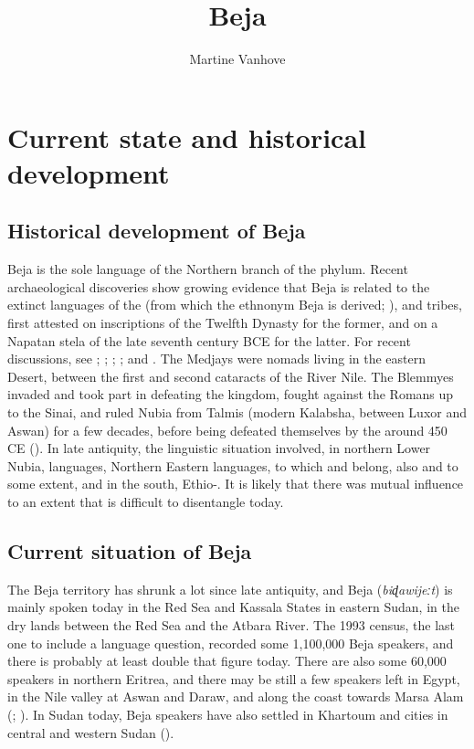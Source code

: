 \documentclass[output=paper]{langsci/langscibook}
\author{Martine Vanhove\affiliation{LLACAN (CNRS, INALCO)}}
\title{Beja}
\begin{document}
\maketitle 
  


 \section{Current state and historical development}


 \subsection{Historical development of Beja}


Beja is the sole language of the {Northern}  branch of the  phylum. Recent archaeological discoveries show growing evidence that Beja is related to the extinct languages of the  (from which the ethnonym Beja is derived; \citealt[1175]{Rilly2014}), and  tribes, first attested on  inscriptions of the Twelfth Dynasty for the former, and on a Napatan stela of the late seventh century BCE for the latter. For recent discussions, see \citet{Browne2003}; \citet{El-Sayed2011}; \citet{Zibelius-Chen2014}; \citet{Rilly2014}; and \citet{Rilly2018}. The Medjays were nomads living in the eastern  Desert, between the first and second cataracts of the River Nile. The Blemmyes invaded and took part in defeating the  kingdom, fought against the Romans up to the Sinai, and ruled Nubia from Talmis (modern Kalabsha, between Luxor and Aswan) for a few decades, before being defeated themselves by the  around 450 CE (\citealt{Rilly2018}). In late antiquity, the linguistic situation involved, in northern Lower Nubia,  languages, {Northern} {Eastern}  languages, to which  and  belong, also  and  to some extent, and in the south, Ethio-. It is likely that there was mutual influence to an extent that is difficult to disentangle today. 


 
 \subsection{Current situation of Beja}


The Beja territory has shrunk a lot since late antiquity, and Beja (\textit{biɖawijeːt}) is mainly spoken today in the Red Sea and Kassala States in eastern Sudan, in the dry lands between the Red Sea and the Atbara River. The 1993 census, the last one to include a language question, recorded some 1,100,000 Beja speakers, and there is probably at least double that figure today. There are also some 60,000 speakers in northern Eritrea, and there may be still a few speakers left in Egypt, in the Nile valley at Aswan and Daraw, and along the coast towards Marsa Alam (\citealt{Morin1995}; \citealt{Wedekind2012}). In Sudan today, Beja speakers have also settled in Khartoum and cities in central and western Sudan (\citealt[67]{HamidAhmed2005book}).
\end{document}
